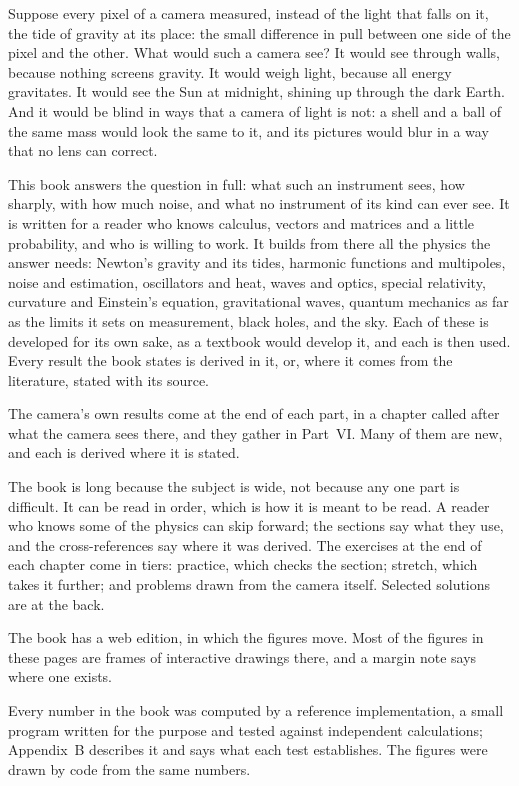 
Suppose every pixel of a camera measured, instead of the light that falls on it, the tide of gravity at its place:
the small difference in pull between one side of the pixel and the other. What would such a camera see? It would
see through walls, because nothing screens gravity. It would weigh light, because all energy gravitates. It would
see the Sun at midnight, shining up through the dark Earth. And it would be blind in ways that a camera of light is
not: a shell and a ball of the same mass would look the same to it, and its pictures would blur in a way that no lens
can correct.

This book answers the question in full: what such an instrument sees, how sharply, with how much noise, and what no
instrument of its kind can ever see. It is written for a reader who knows calculus, vectors and matrices and a
little probability, and who is willing to work. It builds from there all the physics the answer
needs: Newton's gravity and its tides, harmonic functions and multipoles, noise and estimation, oscillators and
heat, waves and optics, special relativity, curvature and Einstein's equation, gravitational waves, quantum
mechanics as far as the limits it sets on measurement, black holes, and the sky. Each of these is developed for
its own sake, as a textbook would develop it, and each is then used. Every result the book states is derived in
it, or, where it comes from the literature, stated with its source.

The camera's own results come at the end of each part, in a chapter called after what the camera sees there, and
they gather in Part~VI. Many of them are new, and each is derived where it is stated.

The book is long because the subject is wide, not because any one part is difficult. It can be read in order, which
is how it is meant to be read. A reader who knows some of the physics can skip forward; the sections say what they
use, and the cross-references say where it was derived. The exercises at the end of each chapter come in tiers:
practice, which checks the section; stretch, which takes it further; and problems drawn from the camera itself.
Selected solutions are at the back.

The book has a web edition, in which the figures move. Most of the figures in these pages are frames of
interactive drawings there, and a margin note says where one exists.

Every number in the book was computed by a reference implementation, a small program written for the purpose and
tested against independent calculations; Appendix~B describes it and says what each test establishes. The figures
were drawn by code from the same numbers.


